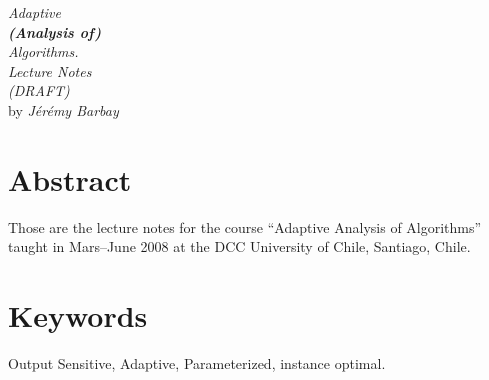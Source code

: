 
\def\title{{\em {\huge Adaptive} \\ \textbf{(Analysis of)} \\ {\huge Algorithms}. \\[2cm]
    Lecture Notes \\ (DRAFT)}}


\def\authors{{\em J{\'e}r{\'e}my Barbay}}
\def\year{{\em 2008}}
\def\location{{\em DCC, University of Chile}}


\begin{titlepage}
\vspace*{3cm}
\begin{center}
\Large \title \\


\vspace{2cm} \large
by \authors \\

\end{center}
\end{titlepage}

\clearpage


\begin{center}

\vfill
\section*{Abstract}

Those are the lecture notes for the course ``Adaptive Analysis of
Algorithms'' taught in Mars--June 2008 at the DCC University of Chile,
Santiago, Chile.

\vfill
\section*{Keywords}

Output Sensitive, Adaptive, Parameterized, instance optimal.

\vfill
\end{center}




\clearpage{\pagestyle{empty}\cleardoublepage}
\tableofcontents

\cleardoublepage
{}












